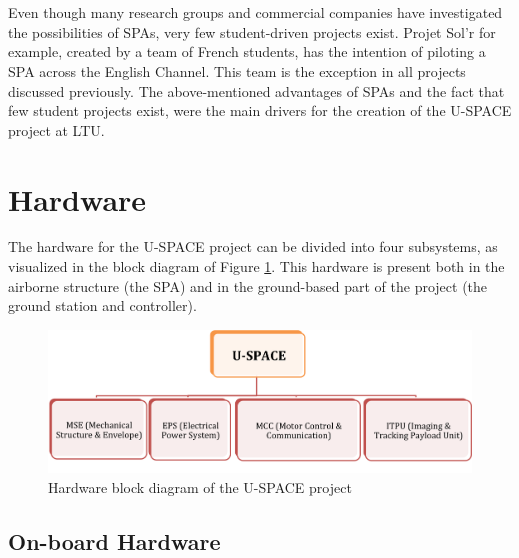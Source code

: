 \\
\\
Even though many research groups and commercial companies have investigated the possibilities of \ac{SPA}s, very few student-driven projects exist. Projet Sol'r \cite{website:solr} for example, created by a team of French students, has the intention of piloting a \ac{SPA} across the English Channel. This team is the exception in all projects discussed previously. The above-mentioned advantages of \ac{SPA}s and the fact that few student projects exist, were the main drivers for the creation of the \ac{U-SPACE} project at \ac{LTU}.

\section{Hardware}
\label{sec:intro_hardware}

The hardware for the \ac{U-SPACE} project can be divided into four subsystems, as visualized in the block diagram of Figure \ref{fig:hardware_block}. This hardware is present both in the airborne structure (the \ac{SPA}) and in the ground-based part of the project (the ground station and controller).

\begin{figure}[htbp!]
\centering
\includegraphics[width=\textwidth]{figures/hardware_block.png}
\caption{Hardware block diagram of the U-SPACE project}
\label{fig:hardware_block}
\end{figure}

\subsection{On-board Hardware}

